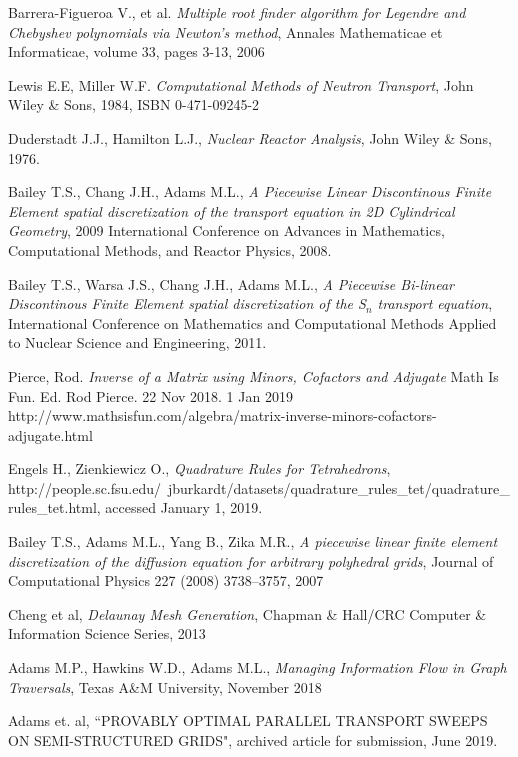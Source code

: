 \documentclass[11pt,letterpaper,titlepage]{article}
\numberwithin{equation}{section}
\begin{document}
\newpage
{}
\begin{thebibliography}{1}
    
     Barrera-Figueroa V., et al. {\em Multiple root finder algorithm for Legendre and Chebyshev polynomials via Newton’s method}, Annales Mathematicae et Informaticae, volume 33, pages 3-13, 2006
    
     Lewis E.E, Miller W.F. {\em Computational Methods of Neutron Transport}, John Wiley \& Sons, 1984, ISBN 0-471-09245-2
    
     Duderstadt J.J., Hamilton L.J., {\em Nuclear Reactor Analysis}, John Wiley \& Sons, 1976.
    
       Bailey T.S., Chang J.H., Adams M.L., {\em A Piecewise Linear Discontinous Finite Element spatial discretization of the transport equation in 2D Cylindrical Geometry}, 2009 International Conference on Advances in Mathematics, Computational Methods, and Reactor Physics, 2008.
    
      Bailey T.S., Warsa J.S., Chang J.H., Adams M.L., {\em A Piecewise Bi-linear Discontinous Finite Element spatial discretization of the S$_n$ transport equation}, International Conference on Mathematics and Computational Methods Applied to Nuclear Science and Engineering, 2011.
    
     Pierce, Rod. {\em Inverse of a Matrix using Minors, Cofactors and Adjugate} Math Is Fun. Ed. Rod Pierce. 22 Nov 2018. 1 Jan 2019 http://www.mathsisfun.com/algebra/matrix-inverse-minors-cofactors-adjugate.html
    
     Engels H., Zienkiewicz O., {\em Quadrature Rules for Tetrahedrons}, http://people.sc.fsu.edu/~jburkardt/datasets/quadrature\_rules\_tet/quadrature\_rules\_tet.html, accessed January 1, 2019.
    
     Bailey T.S., Adams M.L., Yang B., Zika M.R., {\em A piecewise linear finite element discretization of the diffusion equation for arbitrary polyhedral grids}, Journal of Computational Physics 227 (2008) 3738–3757, 2007
    
     Cheng et al, {\em Delaunay Mesh Generation}, Chapman \& Hall/CRC Computer \& Information Science Series, 2013
    
     Adams M.P., Hawkins W.D., Adams M.L., {\em Managing Information Flow in Graph Traversals}, Texas A\&M University, November 2018
    
     Adams et. al, ``PROVABLY OPTIMAL PARALLEL TRANSPORT SWEEPS ON
    SEMI-STRUCTURED GRIDS", archived article for submission, June 2019.
    
    
\end{thebibliography}
\end{document}
